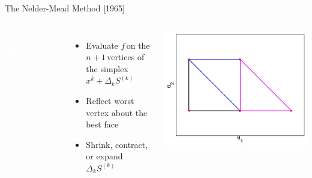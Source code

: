 \documentclass[handout,aspectratio=54]{beamer}
\numberwithin{theorem}{section}
\begin{document}
\begin{frame}{The Nelder-Mead Method [1965]}
\begin{columns}
\colorbox[rgb]{0.5,0.6,0.7}{\textcolor{white}{Basic iteration($k\ge0$):}}
\begin{itemize}\footnotesize
\item Evaluate $f$\,on the $n+1$\,vertices of the simplex\,$x^k+\Delta_kS^{(k)}$
\item Reflect worst vertex about the best face
\item Shrink, contract, or expand\,$\Delta_kS^{(k)}$
\end{itemize}

\includegraphics[width=\textwidth]{fig/18-3.jpg}
\end{columns}

\vspace{2.4cm}
\end{frame}
\end{document}
